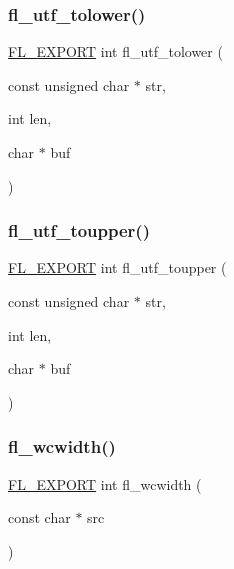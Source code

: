 \subsubsection{\texorpdfstring{fl\+\_\+utf\+\_\+tolower()}{fl\_utf\_tolower()}}
{\footnotesize\ttfamily \hyperlink{_fl___export_8_h_aa9ba29a18aee9d738370a06eeb4470fc}{F\+L\+\_\+\+E\+X\+P\+O\+RT} int fl\+\_\+utf\+\_\+tolower (\begin{DoxyParamCaption}\item[{const unsigned char $\ast$}]{str,  }\item[{int}]{len,  }\item[{char $\ast$}]{buf }\end{DoxyParamCaption})}

\mbox{\label{group__fl__unicode_gad93d85e990d7d839bddc07503ea08f3d}} 
\subsubsection{\texorpdfstring{fl\+\_\+utf\+\_\+toupper()}{fl\_utf\_toupper()}}
{\footnotesize\ttfamily \hyperlink{_fl___export_8_h_aa9ba29a18aee9d738370a06eeb4470fc}{F\+L\+\_\+\+E\+X\+P\+O\+RT} int fl\+\_\+utf\+\_\+toupper (\begin{DoxyParamCaption}\item[{const unsigned char $\ast$}]{str,  }\item[{int}]{len,  }\item[{char $\ast$}]{buf }\end{DoxyParamCaption})}

\mbox{\label{group__fl__unicode_ga702a820d16a76a28ef5c68b045f7ed19}} 
\subsubsection{\texorpdfstring{fl\+\_\+wcwidth()}{fl\_wcwidth()}}
{\footnotesize\ttfamily \hyperlink{_fl___export_8_h_aa9ba29a18aee9d738370a06eeb4470fc}{F\+L\+\_\+\+E\+X\+P\+O\+RT} int fl\+\_\+wcwidth (\begin{DoxyParamCaption}\item[{const char $\ast$}]{src }\end{DoxyParamCaption})}

